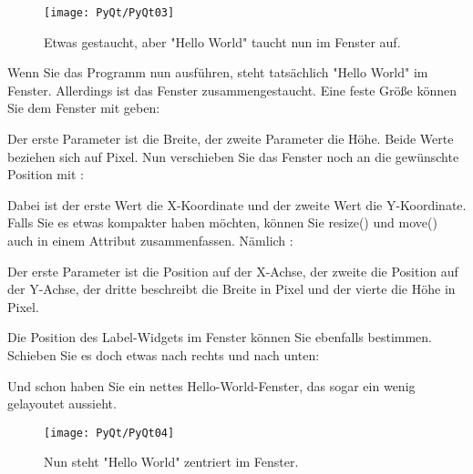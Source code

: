 \begin{figure}
    \centering
    \texttt{[image: PyQt/PyQt03]}    
    \caption{Etwas gestaucht, aber "Hello World" taucht nun im Fenster auf.}\label{PyQt03}
\end{figure}     


    
Wenn Sie das Programm nun ausführen, steht tatsächlich "Hello World" im Fenster. Allerdings ist das Fenster zusammengestaucht. Eine feste Größe können Sie dem Fenster mit  geben:

\medskip
    

\medskip

Der erste Parameter ist die Breite, der zweite Parameter die Höhe. Beide Werte beziehen sich auf Pixel. Nun verschieben Sie das Fenster noch an die gewünschte Position mit :
    
\medskip


\medskip

Dabei ist der erste Wert die X-Koordinate und der zweite Wert die Y-Koordinate. Falls Sie es etwas kompakter haben möchten, können Sie resize() und move() auch in einem Attribut zusammenfassen. Nämlich :
    
\medskip


\medskip

Der erste Parameter ist die Position auf der X-Achse, der zweite die Position auf der Y-Achse, der dritte beschreibt die Breite in Pixel und der vierte die Höhe in Pixel.
    
Die Position des Label-Widgets im Fenster können Sie ebenfalls bestimmen. Schieben Sie es doch etwas nach rechts und nach unten:
    
\medskip


\medskip

Und schon haben Sie ein nettes Hello-World-Fenster, das sogar ein wenig gelayoutet aussieht.
    
    
\begin{figure}
  \centering
  \texttt{[image: PyQt/PyQt04]}    
  \caption{Nun steht "Hello World" zentriert im Fenster.}\label{PyQt04}
\end{figure}     
    

